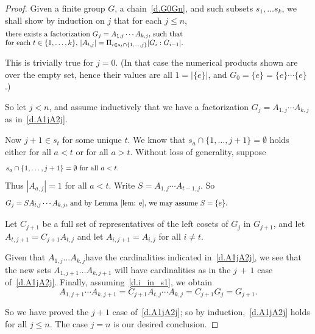 \documentclass{amsart}
\begin{document}
\begin{proof}
Given a finite group $G$, a chain~\eqref{d.G0Gn}, and such subsets $s_1, \dots s_k$, we shall show by induction on $j$ that for each $j \leq n$, 
%
\begin{equation}\begin{minipage}[c]{35pc}\label{d.A1jA2j}
there exists a factorization $G_j = A_{1,j} \cdots A_{k,j}$, such that\\
 for each $t \in \{1,\dots,k\}$, $|A_{t,j}| = \Pi_{i \in s_t \cap \{1,\dots,j\}} | G_i : G_{i-1}|$.
\end{minipage}\end{equation}

This is trivially true for $j=0$.   (In that case the numerical products shown are over the empty set, hence
their values are all $1 = |\{e\}|$, and $G_0 = \{e\} = \{e\}\cdots\{e\}$.)

So let $j < n$, and assume inductively that we have a factorization $G_j = A_{1,j} \cdots A_{k,j}$ as in~\eqref{d.A1jA2j}.  

Now $j+1 \in s_t$ for some unique $t$.  We know that $s_a \cap \{1,\dots,j+1\} = \emptyset$ holds either for all $a < t$ or for all $a > t$.  Without loss of generality, suppose 
%
\begin{equation*}\begin{minipage}[c]{35pc}
$s_a \cap \{1,\dots,j+1\} = \emptyset$ for all $a < t$.
\end{minipage}\end{equation*}
%
Thus $|A_{a,j}| = 1$ for all $a < t$.  Write $S = A_{1,j} \cdots A_{t-1,j}$.  So 
\begin{equation}\begin{minipage}[c]{35pc}\label{d.i_in_s1}
$G_j = S A_{t,j} \cdots A_{k,j}$, and by Lemma \ref{lem: e}, we may assume $S = \{ e \}$.
\end{minipage}\end{equation}

Let $C_{j+1}$ be a full set of representatives of the left cosets of $G_j$ in $G_{j+1}$, and let
$A_{t,j+1} = C_{j+1} A_{t,j}$ and let $A_{i,j+1} = A_{i,j}$ for all $i \neq t$.  

Given that $A_{1,j} \dots A_{k,j}$have the cardinalities indicated in~\eqref{d.A1jA2j}, we see that the new sets $A_{1,j+1} \dots A_{k,j+1}$ will
have cardinalities as in the $j\,{+}\,1$ case of~\eqref{d.A1jA2j}.  Finally, assuming~\eqref{d.i_in_s1}, we obtain $$A_{1,j+1} \cdots A_{k,j+1} = C_{j+1} A_{t,j} \cdots A_{k,j} = C_{j+1} G_j = G_{j+1}.$$

So we have proved the $j + 1$ case of~\eqref{d.A1jA2j};
so by induction,~\eqref{d.A1jA2j} holds for all $j \leq n$. The case $j = n$ is
our desired conclusion.
\end{proof}
\end{document}
